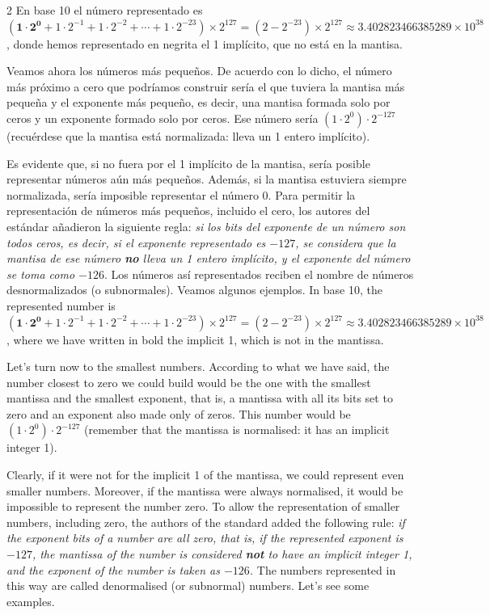 \begin{paracol}{2}
En base 10 el número representado es $(\mathbf{1\cdot2^0}+1\cdot2^{-1}+1\cdot2^{-2}+\cdots+1\cdot2^{-23})\times2^{127}=(2-2^{-23})\times2^{127}\approx 3.402823466385289\times10^{38}$, donde hemos representado en negrita el 1 implícito, que no está en la mantisa.

Veamos ahora los números más pequeños. De acuerdo con lo dicho, el número más próximo a cero que podríamos construir sería el que tuviera la mantisa más pequeña y el exponente más pequeño, es decir, una mantisa formada solo por ceros y un exponente formado solo por ceros. Ese número sería $(1\cdot 2^0)\cdot2^{-127}$ (recuérdese que la mantisa está normalizada: lleva un 1 entero implícito).

 Es evidente que, si no fuera por el 1 implícito de la mantisa, sería posible representar números aún más pequeños. Además, si la mantisa estuviera siempre normalizada, sería imposible representar el número 0. Para permitir la representación de números más pequeños, incluido el cero, los autores del estándar añadieron la siguiente regla: \emph{si los bits del exponente de un número son todos ceros, es decir, si el exponente representado es $-127$, se considera que la mantisa de ese número \textbf{no} lleva un 1 entero implícito, y el exponente del número se toma como $-126$}. Los números así representados reciben el nombre de números desnormalizados (o subnormales). Veamos algunos ejemplos.
\switchcolumn
In base 10, the represented number is $(\mathbf{1\cdot2^0}+1\cdot2^{-1}+1\cdot2^{-2}+\cdots+1\cdot2^{-23})\times2^{127}=(2-2^{-23})\times2^{127}\approx 3.402823466385289\times10^{38}$, where we have written in bold the implicit 1, which is not in the mantissa.

Let's turn now to the smallest numbers. According to what we have said, the number closest to zero we could build would be the one with the smallest mantissa and the smallest exponent, that is, a mantissa with all its bits set to zero and an exponent also made only of zeros. This number would be $(1\cdot 2^0)\cdot2^{-127}$ (remember that the mantissa is normalised: it has an implicit integer 1).

 Clearly, if it were not for the implicit 1 of the mantissa, we could represent even smaller numbers. Moreover, if the mantissa were always normalised, it would be impossible to represent the number zero. To allow the representation of smaller numbers, including zero, the authors of the standard added the following rule: \emph{if the exponent bits of a number are all zero, that is, if the represented exponent is $-127$, the mantissa of the number is considered \textbf{not} to have an implicit integer 1, and the exponent of the number is taken as $-126$.} The numbers represented in this way are called denormalised (or subnormal) numbers. Let's see some examples.
\end{paracol}

